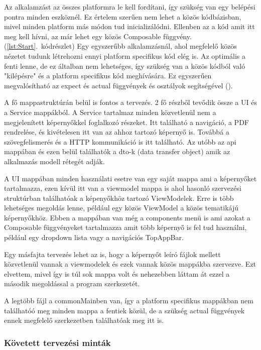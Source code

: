 Az alkalamzást az összes platformra le kell fordítani, így szükség van egy belépési pontra minden eszköznél.
Ez értelem szerűen nem lehet a közös kódbázisban, mivel minden platform más módon tud inicializálódni.
Ellenben az a kód amit itt meg kell hívni, az már lehet egy közös Composable függvény. (\ref{lst:Start}.~kódrészlet)
Egy egyszerűbb alkalamzásnál, ahol megfelelő közös nézetet tudunk létrehozni ennyi platform specifikus kód elég is.
Az optimális a fenti lenne, de ez általban nem lehetséges, így szükség van a közös kódból való "kilépésre" és a platform specifikus kód meghívására.
Ez egyszerűen megvalósítható az expect és actual függvények és osztályok segítségével ().


A fő mappastruktúrán belül is fontos a tervezés.
2 fő részből tevődik össze a UI és a Service mappákból.
A Service tartalmaz minden közvetlenül nem a megjelenített képernyőkkel foglalkozó részeket.
Itt található a navigáció, a PDF rendrelése, és kivételesen itt van az ahhoz tartozó képernyő is.
Továbbá a szövegfelismerés és a HTTP kommunikáció is itt található.
Az utóbb az api mappában és ezen belül találhatók a dto-k (data transfer object) amik az alkalmazás modell rétegét adják.

A UI mappában minden használati esetre van egy saját mappa ami a képernyőket tartalmazza, ezen kívül itt van a viewmodel mappa is ahol hasonló szervezési struktúrban találhatóak a képenyőkhöz tartozó ViewModelek.
Erre is több lehetséges megoldás lenne, például egy közös ViewModel a közös tematikájú képernyőkhöz.
Ebben a mappában van még a components menü is ami azokat a Composable függvényeket tartalmazza amit több képernyő is fel tud használni, például egy dropdown lista vagy a navigációs TopAppBar.

Egy másfajta tervezés lehet az is, hogy a képernyőt leíró fájlok mellett közvetlenül vannak a viewmodelek és ezek vannak közös mappákba szervezve.
Ezt elvettem, mivel így is túl sok mappa volt és nehezebben láttam át ezzel a második megoldással a program szerkezetét.

A legtöbb fájl a commonMainben van, így a platform specifikus mappákban nem találhatóó meg minden mappa a fentiek közül, de a szükség actual függvények ennek megfelelő szerkezetben találhatóak meg itt is.

\subsubsection{Követett tervezési minták}

